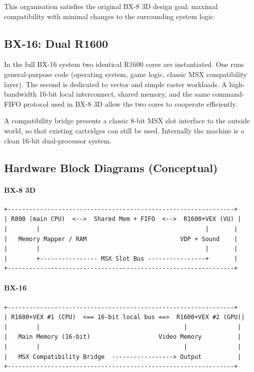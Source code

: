 \documentclass[11pt,a4paper]{article}
\begin{document}
This organisation satisfies the original BX-8 3D design goal: maximal compatibility with minimal changes to the surrounding system logic.

\subsection{BX-16: Dual R1600}

In the full BX-16 system two identical R1600 cores are instantiated. One runs general-purpose code (operating system, game logic, classic MSX compatibility layer). The second is dedicated to vector and simple raster workloads. A high-bandwidth 16-bit local interconnect, shared memory, and the same command-FIFO protocol used in BX-8 3D allow the two cores to cooperate efficiently.

A compatibility bridge presents a classic 8-bit MSX slot interface to the outside world, so that existing cartridges can still be used. Internally the machine is a clean 16-bit dual-processor system.

\subsection{Hardware Block Diagrams (Conceptual)}

\paragraph{BX-8 3D}
\begin{verbatim}
+---------------------------------------------------------------+
| R800 (main CPU)  <-->  Shared Mem + FIFO  <-->  R1600+VEX (VU) |
|        |                                              |       |
|   Memory Mapper / RAM                          VDP + Sound    |
|        |                                              |       |
|        +---------------- MSX Slot Bus ----------------+       |
+---------------------------------------------------------------+
\end{verbatim}

\paragraph{BX-16}
\begin{verbatim}
+---------------------------------------------------------------+
| R1600+VEX #1 (CPU)  <== 16-bit local bus ==>  R1600+VEX #2 (GPU)|
|        |                                        |              |
|   Main Memory (16-bit)                   Video Memory          |
|        |                                        |              |
|   MSX Compatibility Bridge  -----------------> Output          |
+---------------------------------------------------------------+
\end{verbatim}
\end{document}
